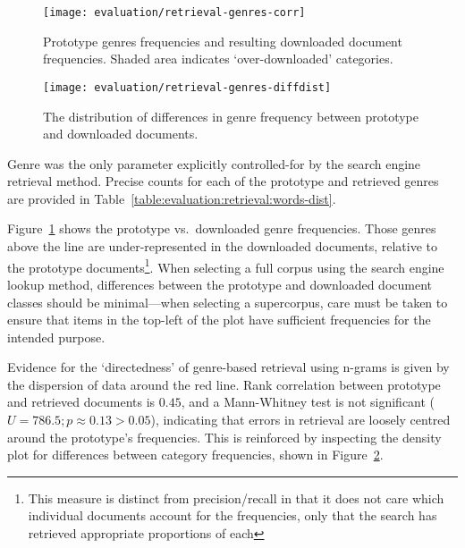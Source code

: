 \FloatBarrier{}

\begin{figure}[Ht]
    \centering
    \texttt{[image: evaluation/retrieval-genres-corr]}
    \caption{Prototype genres frequencies and resulting downloaded document frequencies.  Shaded area indicates `over-downloaded' categories.}
    \label{fig:evaluation:retrieval:genres-corr}
\end{figure}


\begin{figure}[Ht]
    \centering
    \texttt{[image: evaluation/retrieval-genres-diffdist]}
    \caption{The distribution of differences in genre frequency between prototype and downloaded documents.}
    \label{fig:evaluation:retrieval:genres-diffdist}
\end{figure}


Genre was the only parameter explicitly controlled-for by the search engine retrieval method.  Precise counts for each of the prototype and retrieved genres are provided in Table~\ref{table:evaluation:retrieval:words-dist}.  

Figure~\ref{fig:evaluation:retrieval:genres-corr} shows the prototype vs.\ downloaded genre frequencies.  Those genres above the line are under-represented in the downloaded documents, relative to the prototype documents\footnote{This measure is distinct from precision/recall in that it does not care which individual documents account for the frequencies, only that the search has retrieved appropriate proportions of each}.
When selecting a full corpus using the search engine lookup method, differences between the prototype and downloaded document classes should be minimal---when selecting a supercorpus, care must be taken to ensure that items in the top-left of the plot have sufficient frequencies for the intended purpose.

Evidence for the `directedness' of genre-based retrieval using n-grams is given by the dispersion of data around the red line.  Rank correlation between prototype and retrieved documents is $0.45$, and a Mann-Whitney test is not significant ($U = 786.5; p \approx 0.13 > 0.05$), indicating that errors in retrieval are loosely centred around the prototype's frequencies.  This is reinforced by inspecting the density plot for differences between category frequencies, shown in Figure~\ref{fig:evaluation:retrieval:genres-diffdist}.

